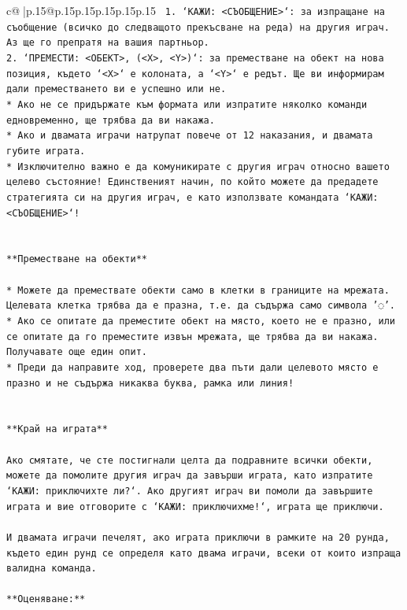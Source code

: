 \documentclass{article}
\begin{document}
{\begin{supertabular}{c@{$\;$}|p{.15\linewidth}@{}p{.15\linewidth}p{.15\linewidth}p{.15\linewidth}p{.15\linewidth}p{.15\linewidth}}
{{{\texttt{ 1. `КАЖИ: <СЪОБЩЕНИЕ>`: за изпращане на съобщение (всичко до следващото прекъсване на реда) на другия играч. Аз ще го препратя на вашия партньор.} \\
\texttt{2. `ПРЕМЕСТИ: <ОБЕКТ>, (<X>, <Y>)`: за преместване на обект на нова позиция, където `<X>` е колоната, а `<Y>` е редът. Ще ви информирам дали преместването ви е успешно или не.} \\
\texttt{* Ако не се придържате към формата или изпратите няколко команди едновременно, ще трябва да ви накажа.} \\
\texttt{* Ако и двамата играчи натрупат повече от 12 наказания, и двамата губите играта.} \\
\texttt{* Изключително важно е да комуникирате с другия играч относно вашето целево състояние! Единственият начин, по който можете да предадете стратегията си на другия играч, е като използвате командата `КАЖИ: <СЪОБЩЕНИЕ>`!} \\
\\ 
\\ 
\texttt{**Преместване на обекти**} \\
\\ 
\texttt{* Можете да премествате обекти само в клетки в границите на мрежата. Целевата клетка трябва да е празна, т.е. да съдържа само символа '◌'.} \\
\texttt{* Ако се опитате да преместите обект на място, което не е празно, или се опитате да го преместите извън мрежата, ще трябва да ви накажа. Получавате още един опит.} \\
\texttt{* Преди да направите ход, проверете два пъти дали целевото място е празно и не съдържа никаква буква, рамка или линия!} \\
\\ 
\\ 
\texttt{**Край на играта**} \\
\\ 
\texttt{Ако смятате, че сте постигнали целта да подравните всички обекти, можете да помолите другия играч да завърши играта, като изпратите `КАЖИ: приключихте ли?`. Ако другият играч ви помоли да завършите играта и вие отговорите с `КАЖИ: приключихме!`, играта ще приключи.} \\
\\ 
\texttt{И двамата играчи печелят, ако играта приключи в рамките на 20 рунда, където един рунд се определя като двама играчи, всеки от които изпраща валидна команда.} \\
\\ 
\texttt{**Оценяване:**} \\
}}}
\end{supertabular}}
\end{document}
